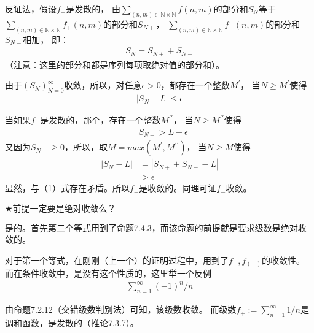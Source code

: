 \documentclass{article}
\begin{document}
反证法，假设$f_{+}$是发散的，
由$\sum \limits_{(n,m) \in \mathbb{N} \times \mathbb{N}}f(n,m)$的部分和$S_N$等于
$\sum \limits_{(n,m) \in \mathbb{N} \times \mathbb{N}}f_{+}(n,m)$的部分和$S_{N+}$，
$\sum \limits_{(n,m) \in \mathbb{N} \times \mathbb{N}}f_{-}(n,m)$的部分和$S_{N-}$相加，
即：
\begin{align*}
    S_N = S_{N+} + S_{N-}
\end{align*}
（注意：这里的部分和都是序列每项取绝对值的部分和）。

由于$(S_N)_{N=0}^\infty$收敛，所以，对任意$\epsilon > 0$，都存在一个整数$M^\prime$，
当$N \geq M^\prime$使得
\begin{align}
    |S_N - L| \leq \epsilon
\end{align}

当如果$f_{+}$是发散的，那个，存在一个整数$M^{\prime\prime}$，
当$N \geq M^{\prime\prime}$使得
\begin{align*}
     & S_{N+} > L + \epsilon
\end{align*}
又因为$S_{N-} \geq 0$，所以，取$M = max(M^\prime, M^{\prime\prime})$，
当$N \geq M$使得
\begin{align*}
    |S_N - L| & = |S_{N+} + S_{N-} - L | \\
              & > \epsilon
\end{align*}
显然，与（1）式存在矛盾。所以$f_{+}$是收敛的。同理可证$f_{-}$收敛。

$\bigstar \textbf{前提一定要是绝对收敛么？} $

是的。首先第二个等式用到了命题7.4.3，而该命题的前提就是要求级数是绝对收敛的。

对于第一个等式，在刚刚（上一个）的证明过程中，用到了$f_{+},f_(-)$的收敛性。
而在条件收敛中，是没有这个性质的，这里举一个反例
\begin{align*}
    \sum \limits_{n=1}^\infty (-1)^n / n
\end{align*}

由命题7.2.12（交错级数判别法）可知，该级数收敛。
而级数$f_{+} := \sum \limits_{n=1}^\infty 1 / n$是调和函数，是发散的（推论7.3.7）。
\end{document}
